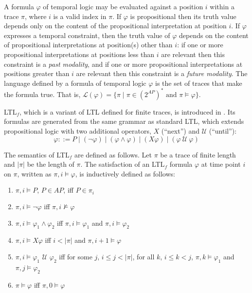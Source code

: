 \documentclass[10pt,a4paper]{amsart}
\theoremstyle{plain}
\theoremstyle{definition}
\theoremstyle{definition}
\DeclareMathOperator{\?}{?}
\begin{document}
A formula $\varphi$ of temporal logic may be evaluated against a
position $i$ within a trace $\pi$, where $i$ is a valid index in $\pi$.
If $\varphi$ is propositional then its truth value depends only on the content of the propositional interpretation
at position $i$. If $\varphi$ expresses a temporal constraint, then the truth value of $\varphi$ depends on the
content of propositional interpretations at position(s) other than $i$: if one or more propositional interpretations at positions less than $i$
are relevant then this constraint is a \textit{past modality}, and if one or more propositional interpretations at positions greater than $i$ are
relevant then this constraint is a \textit{future modality}.
The language defined by a formula of temporal logic $\varphi$ is the set of traces that make the formula true. That is,
$\mathcal{L}(\varphi) = \{ \pi \mid \pi \in (2^{AP})^* \text{ and } \pi \models \varphi \}$.

LTL$_f$, which is a variant of LTL defined for finite traces, is introduced in \cite{ldlf}. Its formulas are generated from the same grammar as standard LTL, which extends propositional logic with two additional operators, $X$ (``next'') and $\mathcal{U}$ (``until''):
\[ \varphi::= P \mid (\neg\varphi) \mid (\varphi \wedge \varphi) \mid (X\varphi) \mid (\varphi\ \mathcal{U}\ \varphi) \]

The semantics of LTL$_f$ are defined as follows. Let $\pi$ be a trace of finite length and $|\pi|$ be the length of $\pi$. The satisfaction of an LTL$_f$ formula $\varphi$ at time point $i$ on $\pi$, written as $\pi,i \models \varphi$, is inductively defined as follows:
\begin{enumerate}
    \item $\pi,i \models P$, $P \in AP$, iff $P \in \pi_i$
    \item $\pi,i \models \neg\varphi$ iff $\pi,i \not\models \varphi$
    \item $\pi,i \models \varphi_1 \wedge \varphi_2$ iff $\pi,i \models \varphi_1$ and $\pi,i \models \varphi_2$
    \item $\pi,i \models X\varphi$ iff $i < |\pi|$ and $\pi,i+1 \models \varphi$
    \item $\pi,i \models \varphi_1 $ $ \mathcal{U} $ $  \varphi_2$ iff for some $j$, $i \leq j < |\pi|$, for all $k$, $i \leq k < j$, $\pi,k \models \varphi_1$ and $\pi,j \models \varphi_2$
    \item $\pi \models \varphi$ iff $\pi,0 \models \varphi$
\end{enumerate}
\end{document}

